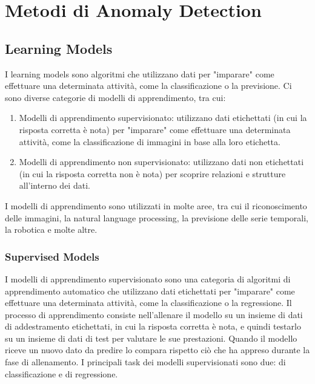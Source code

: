 \chapter{Metodi di Anomaly Detection}
\label{chap:methods}

\section{Learning Models}
I learning models sono algoritmi che utilizzano dati per "imparare" come effettuare una determinata attività, come la classificazione o la previsione. Ci sono diverse categorie di modelli di apprendimento, tra cui:
\begin{enumerate}
\item Modelli di apprendimento supervisionato: utilizzano dati etichettati (in cui la risposta corretta è nota) per "imparare" come effettuare una determinata attività, come la classificazione di immagini in base alla loro etichetta.
\item Modelli di apprendimento non supervisionato: utilizzano dati non etichettati (in cui la risposta corretta non è nota) per scoprire relazioni e strutture all'interno dei dati.
\end{enumerate}

I modelli di apprendimento sono utilizzati in molte aree, tra cui il riconoscimento delle immagini, la natural language processing, la previsione delle serie temporali, la robotica e molte altre.

\subsection{Supervised Models}
I modelli di apprendimento supervisionato sono una categoria di algoritmi di apprendimento automatico che utilizzano dati etichettati per "imparare" come effettuare una determinata attività, come la classificazione o la regressione. Il processo di apprendimento consiste nell'allenare il modello su un insieme di dati di addestramento etichettati, in cui la risposta corretta è nota, e quindi testarlo su un insieme di dati di test per valutare le sue prestazioni. Quando il modello riceve un nuovo dato da predire lo compara rispetto ciò che ha appreso durante la fase di allenamento. I principali task dei modelli supervisionati sono due: di classificazione e di regressione.

